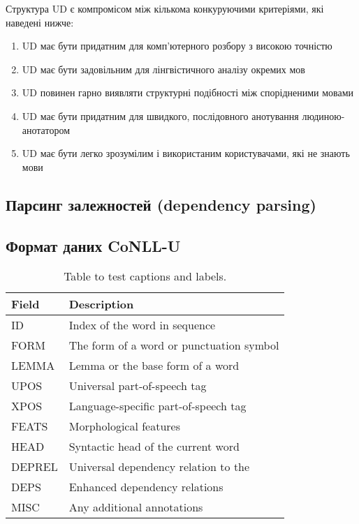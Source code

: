 Структура UD є компромісом між кількома конкуруючими критеріями, які наведені нижче:

\begin{enumerate}
    \item UD має бути придатним для комп'ютерного розбору з високою точністю
    \item UD має бути задовільним для лінгвістичного аналізу окремих мов
    \item UD повинен гарно виявляти структурні подібності між спорідненими мовами
    \item UD має бути придатним для швидкого, послідовного анотування людиною-анотатором
    \item UD має бути легко зрозумілим і використаним користувачами, які не знають мови
\end{enumerate}

\subsection{Парсинг залежностей (dependency parsing)}

\subsection{Формат даних CoNLL-U}

\begin{table}[ht]
\begin{tabular}{|l|l|}
\hline
  Field   & Description \\ \hline
ID        & Index of the word in sequence \\ \hline
FORM      & The form of a word or punctuation symbol \\ \hline
LEMMA     & Lemma or the base form of a word \\ \hline
UPOS      & Universal part-of-speech tag \\ \hline
XPOS      & Language-specific part-of-speech tag \\ \hline
FEATS     & Morphological features \\ \hline
HEAD      & Syntactic head of the current word \\ \hline
DEPREL    & Universal dependency relation to the \\ \hline
DEPS      & Enhanced dependency relations \\ \hline
MISC      & Any additional annotations \\ \hline
\end{tabular}
\caption{Table to test captions and labels.}
\label{table:1}
\end{table}